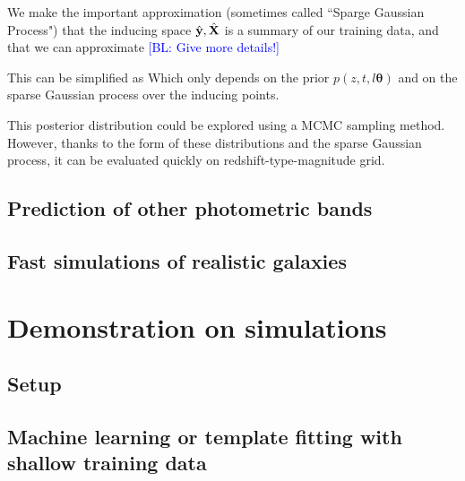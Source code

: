 \documentclass[aps,prd,showpacs,superscriptaddress,groupedaddress]{revtex4}  %
\newcommand{\bl}[1]{\textcolor{blue}{[BL: #1]}}
\begin{document}
We make the important approximation (sometimes called ``Sparge Gaussian Process") that the inducing space $\hat{\vec{y}}, \hat{\mat{X}}$ is a summary of our training data, and that we can approximate
\bl{Give more details!}

This can be simplified as
Which only depends on the prior $p(z,t,l \bm{\theta}) $ and on the sparse Gaussian process over the inducing points.

This posterior distribution could be explored using a MCMC sampling method.
However, thanks to the form of these distributions and the sparse Gaussian process, it can be evaluated quickly on redshift-type-magnitude grid.


\subsection{Prediction of other photometric bands}

\subsection{Fast simulations of realistic galaxies}


\section{Demonstration on simulations}

\subsection{Setup}

\subsection{Machine learning or template fitting with shallow training data}
\end{document}
